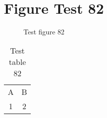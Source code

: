 \documentclass{article}
\begin{document}
\section{Figure Test 82}
\begin{figure}[h]
\caption{Test figure 82}
\end{figure}
\begin{table}[h]
\caption{Test table 82}
\begin{tabular}{cc}
A & B \\
1 & 2
\end{tabular}
\end{table}
\end{document}
